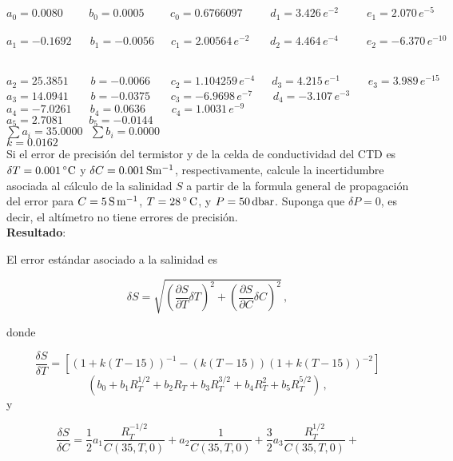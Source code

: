 \documentclass[
]{agujournal2019}
\begin{document}
\(a_0=0.0080\,\,\,\,\,\,\,\,\,\,\,\,\,\,b_0=0.0005\,\,\,\,\,\,\,\,\,\,\,\,\,\,c_0=0.6766097\,\,\,\,\,\,\,\,\,\,\,\,\,\,\,d_1=3.426\,e^{-2}\,\,\,\,\,\,\,\,\,\,\,\,\,\,\,e_1=2.070\,e^{-5}\)
~\(a_1=-0.1692\,\,\,\,\,\,\,\,\,\,b_1=-0.0056\,\,\,\,\,\,\,\,\,c_1=2.00564\,e^{-2}\,\,\,\,\,\,\,\,\,\,\,d_2=4.464\,e^{-4}\,\,\,\,\,\,\,\,\,\,\,\,\,\,\,e_2=-6.370\,e^{-10}\)
~

\(a_2=25.3851\,\,\,\,\,\,\,\,\,\,\,\,b=-0.0066\,\,\,\,\,\,\,\,\,\,\,c_2=1.104259\,e^{-4}\,\,\,\,\,\,\,\,\,d_3=4.215\,e^{-1}\,\,\,\,\,\,\,\,\,\,\,\,\,\,\,e_3=3.989\,e^{-15}\)\\

\(a_3=14.0941\,\,\,\,\,\,\,\,\,\,\,\,b=-0.0375\,\,\,\,\,\,\,\,\,\,\,c_3=-6.9698\,e^{-7}\,\,\,\,\,\,\,\,\,\,\,d_4=-3.107\,e^{-3}\)
~
\(a_4=-7.0261\,\,\,\,\,\,\,\,\,\,b_4=0.0636\,\,\,\,\,\,\,\,\,\,\,\,\,\,c_4=1.0031\,e^{-9}\)\\

\(a_5=2.7081\,\,\,\,\,\,\,\,\,\,\,\,\,\,b_5=-0.0144\,\,\,\,\,\,\,\,\,\,\,\,\,\,\,\,\,\,\,\,\,\,\,\,\,\)\\

\(\sum a_i=35.0000\,\,\,\,\sum b_i=0.0000\)\\

\(k=0.0162\)\\

\noindent Si el error de precisión del termistor y de la celda de
conductividad del CTD es \(\delta{T}=0.001\,^\circ{\rm C}\) y
\(\delta{C}=0.001\,{\rm S}{\rm m}^{-1}\), respectivamente, calcule la
incertidumbre asociada al cálculo de la salinidad \(S\) a partir de la
formula general de propagación del error para
\(C=5\,{\rm S}\,{\rm m}^{-1}\), \(T=28\,^\circ\,{\rm C}\), y
\(P=50\,{\rm dbar}\). Suponga que \(\delta{P}=0\), es decir, el
altímetro no tiene errores de precisión.\\

\textbf{Resultado}:

\noindent El error estándar asociado a la salinidad es

\[\delta{S}=\sqrt{\left( \frac{\partial{S}}{\partial{T}}\delta{T} \right)^2 + \left( \frac{\partial{S}}{\partial{C}}\delta{C}\right)^2}\,,\]

donde

\[\frac{\delta{S}}{\delta{T}}=
      \left[(1+k(T-15))^{-1} - (k(T-15))(1+k(T-15))^{-2}\right]\]
\[\left (b_0+b_1 R_T^{1/2}+b_2 R_T+b_3 R_T^{3/2}+b_4 R_T^{2}+b_5 R_T^{5/2}\right)\,,\]
y

\[\frac{\delta{S}}{\delta{C}}=
                 \frac{1}{2} a_1 \frac{R_T^{-1/2}}{C(35,T,0)} +
         a_2 \frac{1}{C(35,T,0)} +
             \frac{3}{2}a_3 \frac{R_T^{1/2}}{C(35,T,0)}+ \]
\end{document}
